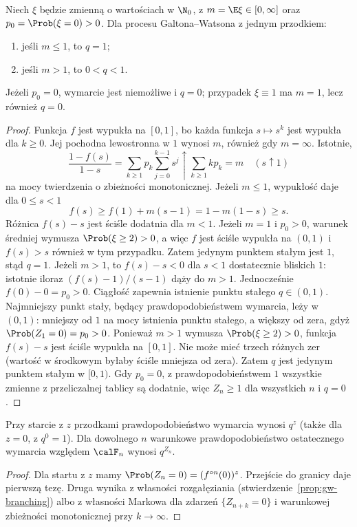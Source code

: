 \begin{twierdzenie}
Niech $\xi$ będzie zmienną o wartościach w $\N_0$, z
$m=\E\xi\in[0,\infty]$ oraz $p_0=\Prob(\xi=0)>0$.
Dla procesu Galtona--Watsona z jednym przodkiem:
\begin{enumerate}
\item jeśli $m\le1$, to $q=1$;
\item jeśli $m>1$, to $0<q<1$.
\end{enumerate}
Jeżeli $p_0=0$, wymarcie jest niemożliwe i $q=0$;
przypadek $\xi\equiv1$ ma $m=1$, lecz również $q=0$.
\end{twierdzenie}
\begin{proof}
Funkcja $f$ jest wypukła na $[0,1]$, bo każda
funkcja $s\mapsto s^k$ jest wypukła dla $k\ge0$.
Jej pochodna lewostronna w $1$ wynosi $m$,
również gdy $m=\infty$. Istotnie,
\[
\frac{1-f(s)}{1-s}
=\sum_{k\ge1}p_k\sum_{j=0}^{k-1}s^j
\uparrow\sum_{k\ge1}kp_k=m
\quad(s\uparrow1)
\]
na mocy twierdzenia o zbieżności monotonicznej.
Jeżeli $m\le1$, wypukłość daje dla $0\le s<1$
\[
f(s)\ge f(1)+m(s-1)=1-m(1-s)\ge s.
\]
Różnica $f(s)-s$ jest ściśle dodatnia dla $m<1$.
Jeżeli $m=1$ i $p_0>0$, warunek średniej wymusza
$\Prob(\xi\ge2)>0$, a więc $f$ jest ściśle wypukła
na $(0,1)$ i $f(s)>s$ również w tym przypadku.
Zatem jedynym punktem stałym jest $1$, stąd $q=1$.
Jeżeli $m>1$, to
$f(s)-s<0$ dla $s<1$ dostatecznie bliskich $1$:
istotnie iloraz $(f(s)-1)/(s-1)$ dąży do $m>1$.
Jednocześnie $f(0)-0=p_0>0$.
Ciągłość zapewnia istnienie punktu stałego $q\in(0,1)$.
Najmniejszy punkt stały, będący prawdopodobieństwem wymarcia,
leży w $(0,1)$: mniejszy od $1$ na mocy istnienia punktu stałego,
a większy od zera, gdyż $\Prob(Z_1=0)=p_0>0$.
Ponieważ $m>1$ wymusza $\Prob(\xi\ge2)>0$,
funkcja $f(s)-s$ jest ściśle wypukła na $[0,1]$.
Nie może mieć trzech różnych zer (wartość w środkowym
byłaby ściśle mniejsza od zera). Zatem $q$ jest
jedynym punktem stałym w $[0,1)$.
Gdy $p_0=0$, z prawdopodobieństwem $1$ wszystkie
zmienne z przeliczalnej tablicy są dodatnie,
więc $Z_n\ge1$ dla wszystkich $n$ i $q=0$.
\end{proof}

\begin{wniosek}
Przy starcie z $z$ przodkami prawdopodobieństwo
wymarcia wynosi $q^z$ (także dla $z=0$, z $q^0=1$).
Dla dowolnego $n$ warunkowe prawdopodobieństwo
ostatecznego wymarcia względem $\calF_n$ wynosi $q^{Z_n}$.
\end{wniosek}
\begin{proof}
Dla startu z $z$ mamy
$\Prob(Z_n=0)=(f^{\circ n}(0))^z$.
Przejście do granicy daje pierwszą tezę.
Druga wynika z własności rozgałęziania
(stwierdzenie~\ref{prop:gw-branching}) albo z własności
Markowa dla zdarzeń $\{Z_{n+k}=0\}$ i warunkowej
zbieżności monotonicznej przy $k\to\infty$.
\end{proof}


